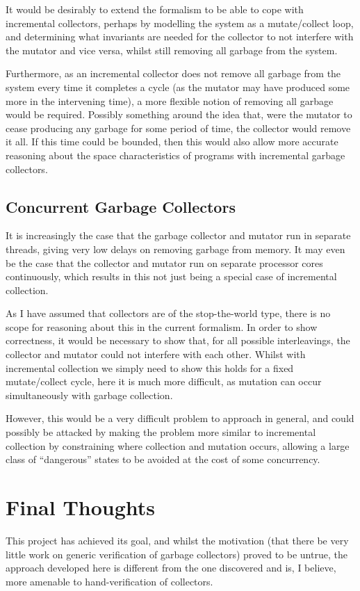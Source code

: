 It would be desirably to extend the formalism to be able to cope with
incremental collectors, perhaps by modelling the system as a
mutate/collect loop, and determining what invariants are needed for
the collector to not interfere with the mutator and vice versa, whilst
still removing all garbage from the system.

Furthermore, as an incremental collector does not remove all garbage
from the system every time it completes a cycle (as the mutator may
have produced some more in the intervening time), a more flexible
notion of removing all garbage would be required. Possibly something
around the idea that, were the mutator to cease producing any garbage
for some period of time, the collector would remove it all. If this
time could be bounded, then this would also allow more accurate
reasoning about the space characteristics of programs with incremental
garbage collectors.

\subsection{Concurrent Garbage Collectors}
\label{sec:conclusion-further-concurrent}

It is increasingly the case that the garbage collector and mutator run
in separate threads, giving very low delays on removing garbage from
memory. It may even be the case that the collector and mutator run on
separate processor cores continuously, which results in this not just
being a special case of incremental collection.

As I have assumed that collectors are of the stop-the-world type,
there is no scope for reasoning about this in the current
formalism. In order to show correctness, it would be necessary to show
that, for all possible interleavings, the collector and mutator could
not interfere with each other. Whilst with incremental collection we
simply need to show this holds for a fixed mutate/collect cycle, here
it is much more difficult, as mutation can occur simultaneously with
garbage collection.

However, this would be a very difficult problem to approach in
general, and could possibly be attacked by making the problem more
similar to incremental collection by constraining where collection and
mutation occurs, allowing a large class of ``dangerous'' states to be
avoided at the cost of some concurrency.

\section{Final Thoughts}
\label{sec:conclusion-thoughts}

This project has achieved its goal, and whilst the motivation (that
there be very little work on generic verification of garbage
collectors) proved to be untrue, the approach developed here is
different from the one discovered and is, I believe, more amenable to
hand-verification of collectors.

